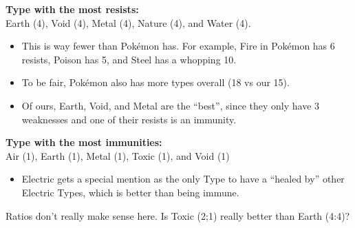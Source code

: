 \begin{itemize}
	\item{\textbf{Type with the most resists:}\\Earth (4), Void (4), Metal (4), Nature (4), and Water (4).
		\begin{itemize}
			\item{This is way fewer than Pok\'{e}mon has. For example, Fire in Pok\'{e}mon has 6 resists, Poison has 5, and Steel has a whopping 10.}
			\item{To be fair, Pok\'{e}mon also has more types overall (18 vs our 15).}
			\item{Of ours, Earth, Void, and Metal are the ``best'', since they only have 3 weaknesses and one of their resists is an immunity.}
		\end{itemize}
		\item{\textbf{Type with the most immunities:}\\Air (1), Earth (1), Metal (1), Toxic (1), and Void (1)
			\begin{itemize}
				\item{Electric gets a special mention as the only Type to have a ``healed by'' other Electric Types, which is better than being immune.}
			\end{itemize}
		}
	}
	\item{Ratios don't really make sense here. Is Toxic (2;1) really better than Earth (4:4)?}
\end{itemize}

\newpage



